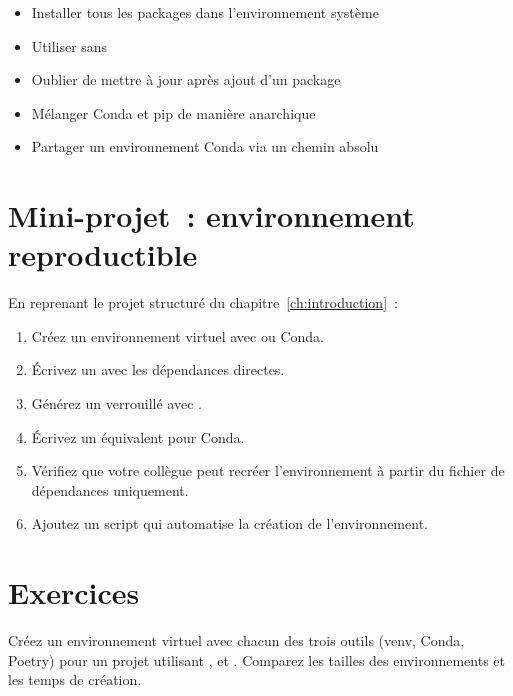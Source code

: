 \begin{antipattern}[title=\textbf{Anti-patterns courants}]
\begin{itemize}
  \item Installer tous les packages dans l'environnement syst\`eme
  \item Utiliser  sans 
  \item Oublier de mettre \`a jour  apr\`es ajout d'un
    package
  \item M\'elanger Conda et pip de mani\`ere anarchique
  \item Partager un environnement Conda via un chemin absolu
\end{itemize}
\end{antipattern}

\section{Mini-projet~: environnement reproductible}
\label{sec:mini-project-ch2}

\begin{miniprojet}[title=\textbf{Mini-projet 2~: Mise en place d'un environnement}]
En reprenant le projet structur\'e du chapitre~\ref{ch:introduction}~:
\begin{enumerate}
  \item Cr\'eez un environnement virtuel avec  ou Conda.
  \item \'Ecrivez un  avec les d\'ependances directes.
  \item G\'en\'erez un  verrouill\'e avec .
  \item \'Ecrivez un  \'equivalent pour Conda.
  \item V\'erifiez que votre coll\`egue peut recr\'eer l'environnement
    \`a partir du fichier de d\'ependances uniquement.
  \item Ajoutez un script  qui automatise la cr\'eation
    de l'environnement.
\end{enumerate}
\end{miniprojet}

\section{Exercices}
\label{sec:exercises-ch2}

\begin{exercice}
Cr\'eez un environnement virtuel avec chacun des trois outils (venv, Conda,
Poetry) pour un projet utilisant ,  et .
Comparez les tailles des environnements et les temps de cr\'eation.
\end{exercice}

